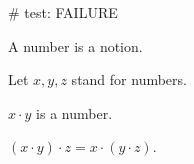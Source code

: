 # test: FAILURE

\begin{forthel}

    \begin{signature}
        A number is a notion.
    \end{signature}

    Let $x, y, z$ stand for numbers.

    \begin{signature}
        $x\cdot y$ is a number.
    \end{signature}

    \begin{axiom}[Associativity]
        $(x\cdot y)\cdot z = x \cdot (y\cdot z)$.
    \end{axiom}
\end{forthel}